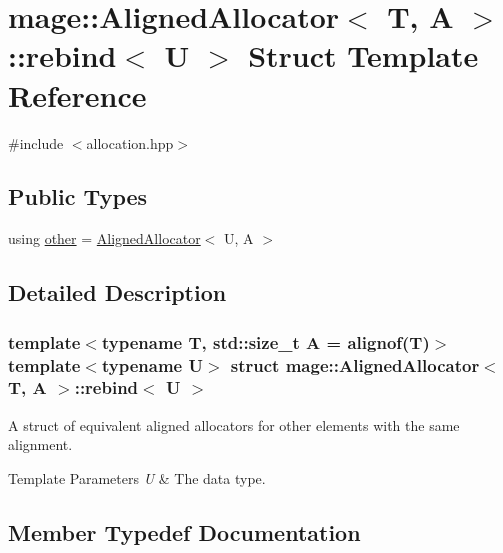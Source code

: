 \hypertarget{structmage_1_1_aligned_allocator_1_1rebind}{}\section{mage\+:\+:Aligned\+Allocator$<$ T, A $>$\+:\+:rebind$<$ U $>$ Struct Template Reference}
\label{structmage_1_1_aligned_allocator_1_1rebind}


{\ttfamily \#include $<$allocation.\+hpp$>$}

\subsection*{Public Types}
\begin{DoxyCompactItemize}
\item 
using \mbox{\hyperlink{structmage_1_1_aligned_allocator_1_1rebind_a12f5ac277f4ef4993d1f73eba91c3439}{other}} = \mbox{\hyperlink{classmage_1_1_aligned_allocator}{Aligned\+Allocator}}$<$ U, A $>$
\end{DoxyCompactItemize}


\subsection{Detailed Description}
\subsubsection*{template$<$typename T, std\+::size\+\_\+t A = alignof(\+T)$>$\newline
template$<$typename U$>$\newline
struct mage\+::\+Aligned\+Allocator$<$ T, A $>$\+::rebind$<$ U $>$}

A struct of equivalent aligned allocators for other elements with the same alignment.


\begin{DoxyTemplParams}{Template Parameters}
{\em U} & The data type. \\
\hline
\end{DoxyTemplParams}


\subsection{Member Typedef Documentation}
\mbox{\label{structmage_1_1_aligned_allocator_1_1rebind_a12f5ac277f4ef4993d1f73eba91c3439}} 
